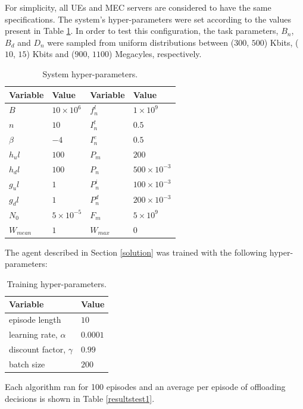 \documentclass[conference]{IEEEtran}
\begin{document}
For simplicity, all \acrshort{UE}s and \acrshort{MEC} servers are considered to have the same specifications. The system's hyper-parameters were set according to the values present in Table \ref{hyperparams}. In order to test this configuration, the task parameters, $B_n$, $B_d$ and $D_n$ were sampled from uniform distributions between ($300$, $500$) Kbits, ($10$, $15$) Kbits and ($900$, $1100$) Megacyles, respectively. 

\begin{table}[H]
\centering
\begin{tabular}{|l|l|l|l|}
\hline
Variable             & Value & Variable                & Value \\ \hline
$B$&$10\times10^{6}$&$f_n^l$&$1\times10^{9}$\\
$n$&$10$&$I_n^t$&$0.5$\\
$\beta$&$-4$&$I_n^e$&$0.5$\\
$h_ul$&$100$& $P_m$&$200$\\
$h_dl$&$100$& $P_n$& $500\times10^{-3}$\\
$g_ul$&$1$&$P_n^i$&$100\times10^{-3}$\\
$g_dl$&$1$&$P_n^d$&$200\times10^{-3}$\\
$N_0$&$5\times10^{-5}$&$F_m$&$5\times10^{9}$\\
$W_{mean}$&$1$&$W_{max}$&$0$\\ \hline
\end{tabular}
\caption{System hyper-parameters.}\label{hyperparams}
\end{table}

The agent described in Section \ref{solution} was trained with the following hyper-parameters:

\begin{table}[H]
\centering
\begin{tabular}{|l|l|}
\hline
Variable & Value \\ \hline
episode length&$10$\\
learning rate, $\alpha$&$0.0001$\\
discount factor, $\gamma$&$0.99$\\
batch size&$200$\\ \hline
\end{tabular}
\caption{Training hyper-parameters.}\label{training_hyperparams}
\end{table}

Each algorithm ran for 100 episodes and an average per episode of offloading decisions is shown in Table \ref{resultstest1}.
\end{document}
